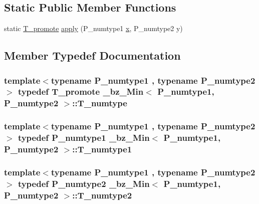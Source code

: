 \subsection*{Static Public Member Functions}
\begin{DoxyCompactItemize}
\item 
static \hyperlink{minmax_8h_aaa88a440c2f0d00798d5b1d42c79308d}{T\+\_\+promote} \hyperlink{class__bz__Min_a775bcfd283975fa242809b71a8366bfd}{apply} (P\+\_\+numtype1 \hyperlink{vecnorm1_8cc_ac73eed9e41ec09d58f112f06c2d6cb63}{x}, P\+\_\+numtype2 y)
\end{DoxyCompactItemize}


\subsection{Member Typedef Documentation}
\hypertarget{class__bz__Min_a785a27e1158f36d3c41b7d7f32e6d623}{}
\subsubsection[{T\+\_\+numtype}]{\setlength{\rightskip}{0pt plus 5cm}template$<$typename P\+\_\+numtype1 , typename P\+\_\+numtype2 $>$ typedef {\bf T\+\_\+promote} {\bf \+\_\+bz\+\_\+\+Min}$<$ P\+\_\+numtype1, P\+\_\+numtype2 $>$\+::{\bf T\+\_\+numtype}}\label{class__bz__Min_a785a27e1158f36d3c41b7d7f32e6d623}
\hypertarget{class__bz__Min_a9e415d4d148ed00301dfdf70c0fd3611}{}
\subsubsection[{T\+\_\+numtype1}]{\setlength{\rightskip}{0pt plus 5cm}template$<$typename P\+\_\+numtype1 , typename P\+\_\+numtype2 $>$ typedef P\+\_\+numtype1 {\bf \+\_\+bz\+\_\+\+Min}$<$ P\+\_\+numtype1, P\+\_\+numtype2 $>$\+::{\bf T\+\_\+numtype1}}\label{class__bz__Min_a9e415d4d148ed00301dfdf70c0fd3611}
\hypertarget{class__bz__Min_a2956736d3ca4bc512b4970bef75ec675}{}
\subsubsection[{T\+\_\+numtype2}]{\setlength{\rightskip}{0pt plus 5cm}template$<$typename P\+\_\+numtype1 , typename P\+\_\+numtype2 $>$ typedef P\+\_\+numtype2 {\bf \+\_\+bz\+\_\+\+Min}$<$ P\+\_\+numtype1, P\+\_\+numtype2 $>$\+::{\bf T\+\_\+numtype2}}\label{class__bz__Min_a2956736d3ca4bc512b4970bef75ec675}


